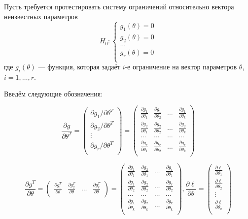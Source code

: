 \documentclass[12pt]{article}
\begin{document}
Пусть требуется протестировать систему ограничений относительно вектора неизвестных параметров
\[
H_0: \begin{cases}
g_1(\theta) = 0 \\
g_2(\theta) = 0 \\
\ldots \\
g_r(\theta) = 0 \\
\end{cases}
\]
где $g_i(\theta)$ — функция, которая задаёт $i$-е ограничение на вектор параметров $\theta$, $i = 1,\ldots, r$.

Введём следующие обозначения: 

\[
\frac{\partial g}{\partial \theta^T} = \begin{pmatrix}
\partial g_1/\partial \theta^T \\
\partial g_2/\partial \theta^T \\
\vdots \\
\partial g_r/\partial \theta^T \\
\end{pmatrix} = \begin{pmatrix}
\frac{\partial g_1}{\partial \theta_1} & \frac{\partial g_1}{\partial \theta_2} & \ldots & \frac{\partial g_1}{\partial \theta_k}\\
\frac{\partial g_2}{\partial \theta_1} & \frac{\partial g_2}{\partial \theta_2} & \ldots & \frac{\partial g_2}{\partial \theta_k}\\
\ldots & \ldots & \ldots & \ldots \\
\frac{\partial g_r}{\partial \theta_1} & \frac{\partial g_r}{\partial \theta_2} & \ldots & \frac{\partial g_r}{\partial \theta_k}\\
\end{pmatrix}
\]

\[
\frac{\partial g^T}{\partial \theta} = \begin{pmatrix}
\frac{\partial g^T_1}{\partial \theta} & \frac{\partial g^T_2}{\partial \theta} & \ldots & \frac{\partial g^T_r}{\partial \theta} \\
\end{pmatrix} = \begin{pmatrix}
\frac{\partial g_1}{\partial \theta_1} & \frac{\partial g_2}{\partial \theta_1} & \ldots & \frac{\partial g_r}{\partial \theta_1}\\
\frac{\partial g_1}{\partial \theta_2} & \frac{\partial g_2}{\partial \theta_2} & \ldots & \frac{\partial g_r}{\partial \theta_2}\\
\ldots & \ldots & \ldots & \ldots \\
\frac{\partial g_1}{\partial \theta_k} & \frac{\partial g_2}{\partial \theta_k} & \ldots & \frac{\partial g_r}{\partial \theta_k}\\
\end{pmatrix},  \frac{\partial \ell}{\partial \theta}= \begin{pmatrix}
\frac{\partial \ell}{\partial \theta_1} \\
\frac{\partial \ell}{\partial \theta_2} \\
\vdots \\
\frac{\partial \ell}{\partial \theta_k} \\
\end{pmatrix}
\]
\end{document}
